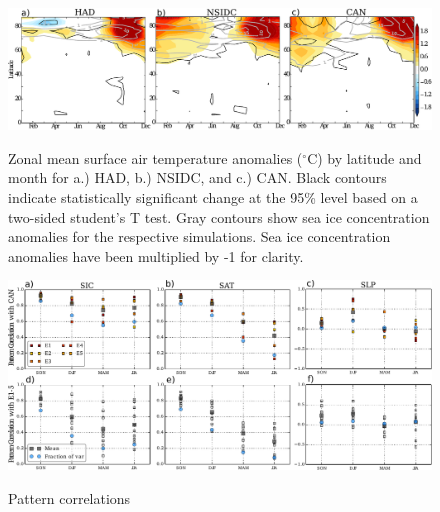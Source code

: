 \documentclass[twocol]{ametsoc}
\begin{document}
\begin{figure}[t]
  \noindent\includegraphics[width=39pc,angle=0]{SATwithlat.pdf}\\
  \caption{Zonal mean surface air temperature anomalies ($^\circ$C) by latitude and month for a.) HAD, b.) NSIDC, and c.) CAN. Black contours indicate statistically significant change at the 95\% level based on a two-sided student's T test. Gray contours show sea ice concentration anomalies for the respective simulations. Sea ice concentration anomalies have been multiplied by -1 for clarity.
}\label{f1b}
\end{figure}

\begin{figure}
  \noindent\includegraphics[width=39pc,angle=0]{pattcorrseas.pdf}\\
  \caption{Pattern correlations
}\label{fig:fig4}
\end{figure}

\clearpage


%
\end{document}
